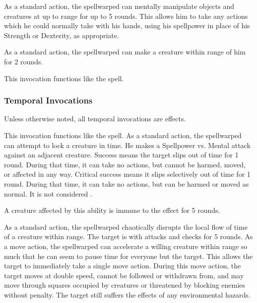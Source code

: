             As a standard action, the spellwarped can mentally manipulate objects and creatures at up to \rngclose range for up to 5 rounds.
            This allows him to take any actions which he could normally take with his hands, using his spellpower in place of his Strength or Dexterity, as appropriate.

            As a standard action, the spellwarped can make a creature within \rngmed range of him \immobilized for 2 rounds.

            This invocation functions like the  spell.

        \subsubsection{Temporal Invocations}
            Unless otherwise noted, all temporal invocations are  effects.

            This invocation functions like the  spell.
            As a standard action, the spellwarped can attempt to lock a creature in time.
            He makes a Spellpower vs. Mental attack against an adjacent creature.
            Success means the target slips out of time for 1 round.
            During that time, it can take no actions, but cannot be harmed, moved, or affected in any way.
            Critical success means it slips selectively out of time for 1 round.
            During that time, it can take no actions, but can be harmed or moved as normal.
            It is not considered \helpless.
            \par A creature affected by this ability is immune to the effect for 5 rounds.

            As a standard action, the spellwarped chaotically disrupts the local flow of time of a creature within \rngclose range.
            The target is \impaired with attacks and checks for 5 rounds.
            As a move action, the spellwarped can accelerate a willing creature within \rngclose range so much that he can seem to pause time for everyone but the target.
            This allows the target to immediately take a single move action.
            During this move action, the target moves at double speed, cannot be followed or withdrawn from, and may move through squares occupied by creatures or threatened by blocking enemies without penalty.
            The target still suffers the effects of any environmental hazards.

